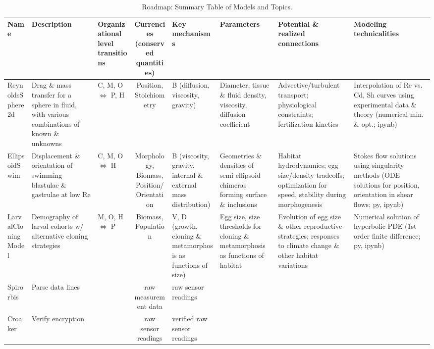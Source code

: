 \documentclass[10pt,legalpaper]{article}
\begin{document}
	
\begin{sidewaystable}
	\centering
	\caption{Roadmap: Summary Table of Models and Topics.} \label{tab:rmap}
	\vspace{.25cm}
	\small
	\begin{tabular}{|l|L|I|S|I|I|I|I|}
		\hline
		Name & Description & Organizational level transitions & Currencies (conserved quantities) & Key mechanisms & Parameters & Potential \& realized connections & Modeling technicalities \\
		\hline
		ReynoldsSphere2d & Drag \& mass transfer for a sphere in fluid, with various combinations of known \& unknowns & C, M, O $\Leftrightarrow$ P, H & Position, Stoichiometry & B (diffusion, viscosity, gravity) & Diameter, tissue \& fluid density, viscosity, diffusion coefficient & Advective/turbulent transport; physiological constraints; fertilization kinetics & Interpolation of Re vs. Cd, Sh curves using experimental data \& theory (numerical min. \& opt.; ipynb) \\
		
		EllipsoidSwim & Displacement \& orientation of swimming blastulae \& gastrulae at low Re & C, M, O $\Leftrightarrow$ H & Morphology, Biomass, Position/Orientation & B (viscosity, gravity, internal \& external mass distribution) & Geometries \& densities of semi-ellipsoid chimeras forming surface \& inclusions & Habitat hydrodynamics; egg size/density tradeoffs; optimization for speed, stability during morphogenesis & Stokes flow solutions using singularity methods (ODE solutions for position, orientation in shear flows; py, ipynb) \\
		
		LarvalCloningModel & Demography of larval cohorts w/ alternative cloning strategies & M, O, H $\Leftrightarrow$ P & Biomass, Population & V, D (growth, cloning \& metamorphosis as functions of size) & Egg size, size thresholds for cloning \& metamorphosis as functions of habitat & Evolution of egg size \& other reproductive strategies; responses to climate change \& other habitat variations & Numerical solution of hyperbolic PDE (1st order finite difference; py, ipynb) \\
		
		Spirorbis & Parse data lines & & raw measurement data & raw sensor readings \\
		
		Croaker & Verify encryption & & raw sensor readings & verified raw sensor readings \\
		

\end{tabular}
\end{sidewaystable}
\end{document}
